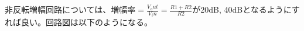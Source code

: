 \documentclass{ltjsarticle}
\begin{document}
\begin{comment}
     \draw (-0.5, -13.0) node[ground, xscale=1, yscale=1, rotate=270, ] (undefined) {};%
     \draw (9.0, -10.0) node[ground, xscale=1, yscale=1, rotate=270, ] (undefined) {};%
     \draw (11.08863, -7.5) node[op amp, xscale=1, rotate=0, ] (U1) {}  (U1)++(1*0.75,  1*1.25) node {U1 }; %
     \draw (11.0,-6.5) to [*short, -] (U1.up);   \draw (11.0,-8.5) to [*short, -] (U1.down); %
     \draw (10.0,-8.0) to [*short, -] (U1.+);   \draw (10.0,-7.0) to [*short, -] (U1.-); \draw (12.0,-7.5) to [*short, -] (U1.out); %
      \draw (-0.5, -7.5) to[*V, l_=V1,, -, ] (-0.5,-10.0){}; %
      \draw (2.5, -7.5) to[*V, l_=V2,, -, ] (2.5,-10.0){}; %
      \draw (5.5, -7.5) to[*V, l_=V3,, -, ] (5.5,-10.0){}; %
      \node (OUT) [] at (13.0,-7.5) {};%
      \node (OUTtxt) [ netlabelcolor, above= -0.24cm of OUT] {{\pgfkeysvalueof{/lt2ti/netlabel/font}OUT}}; %
      \node (VP) [] at (-0.5,-7.0) {};%
      \node (VPtxt) [ netlabelcolor, above= -0.24cm of VP] {{\pgfkeysvalueof{/lt2ti/netlabel/font}VP}}; %
      \node (VN) [] at (2.5,-7.0) {};%
      \node (VNtxt) [ netlabelcolor, above= -0.24cm of VN] {{\pgfkeysvalueof{/lt2ti/netlabel/font}VN}}; %
      \node (IN) [] at (9.0,-7.0) {};%
      \node (INtxt) [ netlabelcolor, above= -0.24cm of IN] {{\pgfkeysvalueof{/lt2ti/netlabel/font}IN}}; %
    
        \end{tikzpicture}
        \caption{反転増幅回路 回路図}
    \end{center}
\end{figure}

\end{comment}

非反転増幅回路については、$増幅率 = \frac{V_out}{V_in} = \frac{R1+R2}{R2}$が20dB, 40dBとなるようにすれば良い。回路図は以下のようになる。
\end{document}
